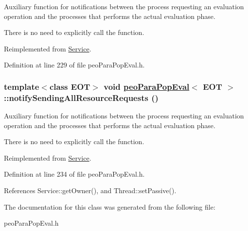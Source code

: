 Auxiliary function for notifications between the process requesting an evaluation operation and the processes that performs the actual evaluation phase. 

There is no need to explicitly call the function. 

Reimplemented from \hyperlink{classService_81ad4d6ebb50045b8977e2ab74826f30}{Service}.

Definition at line 229 of file peo\-Para\-Pop\-Eval.h.\hypertarget{classpeoParaPopEval_b77031fc4807921ffaf7cf6b669a7665}{
\subsubsection[notifySendingAllResourceRequests]{\setlength{\rightskip}{0pt plus 5cm}template$<$class EOT$>$ void \hyperlink{classpeoParaPopEval}{peo\-Para\-Pop\-Eval}$<$ EOT $>$::notify\-Sending\-All\-Resource\-Requests ()}}
\label{classpeoParaPopEval_b77031fc4807921ffaf7cf6b669a7665}


Auxiliary function for notifications between the process requesting an evaluation operation and the processes that performs the actual evaluation phase. 

There is no need to explicitly call the function. 

Reimplemented from \hyperlink{classService_f94cc8a5c2665d4574041737e61e9ffc}{Service}.

Definition at line 234 of file peo\-Para\-Pop\-Eval.h.

References Service::get\-Owner(), and Thread::set\-Passive().

The documentation for this class was generated from the following file:\begin{CompactItemize}
\item 
peo\-Para\-Pop\-Eval.h\end{CompactItemize}
